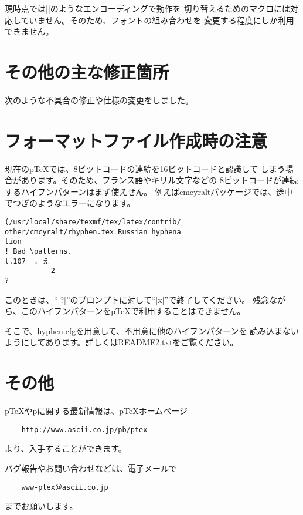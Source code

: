 \documentclass{plnews}
\begin{document}
現時点では|\DeclareTextCompositeCommand|のようなエンコーディングで動作を
切り替えるためのマクロには対応していません。そのため、フォントの組み合わせを
変更する程度にしか利用できません。

\section{その他の主な修正箇所}
次のような不具合の修正や仕様の変更をしました。



\section{フォーマットファイル作成時の注意}
現在のp\TeX{}では、8ビットコードの連続を16ビットコードと認識して
しまう場合があります。そのため、フランス語やキリル文字などの
8ビットコードが連続するハイフンパターンはまず使えせん。
例えばcmcyraltパッケージでは、途中でつぎのようなエラーになります。

\begin{verbatim}
(/usr/local/share/texmf/tex/latex/contrib/
other/cmcyralt/rhyphen.tex Russian hyphena
tion
! Bad \patterns.
l.107  . え
           2
?
\end{verbatim}

このときは、``|?|''のプロンプトに対して``|x|''で終了してください。
残念ながら、このハイフンパターンをp\TeX{}で利用することはできません。

そこで、hyphen.cfgを用意して、不用意に他のハイフンパターンを
読み込まないようにしてあります。詳しくはREADME2.txtをご覧ください。

\section{その他}
p\TeX{}やp\LaTeXe{}に関する最新情報は、p\TeX{}ホームページ
\begin{verbatim}
    http://www.ascii.co.jp/pb/ptex
\end{verbatim}
より、入手することができます。

バグ報告やお問い合わせなどは、電子メールで
\begin{verbatim}
    www-ptex＠ascii.co.jp
\end{verbatim}
までお願いします。
\end{document}

